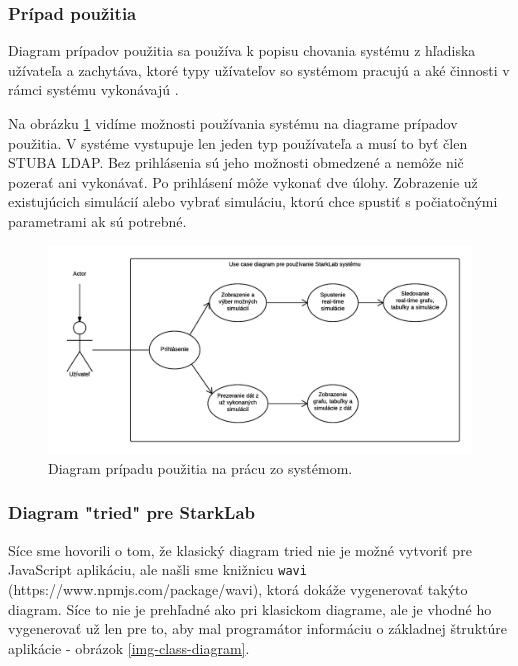 \subsubsection{Prípad použitia}
Diagram prípadov použitia sa používa k popisu chovania systému z hľadiska užívateľa a zachytáva, ktoré typy užívateľov so systémom pracujú a aké činnosti v rámci systému vykonávajú \cite{uml-usecase}.

Na obrázku \ref{img-use-case} vidíme možnosti používania systému na diagrame prípadov použitia. V systéme vystupuje len jeden typ používateľa a musí to byť člen STUBA LDAP. Bez prihlásenia sú jeho možnosti obmedzené a nemôže nič pozerať ani vykonávať. Po prihlásení môže vykonať dve úlohy. Zobrazenie už existujúcich simulácií alebo vybrať simuláciu, ktorú chce spustiť s počiatočnými parametrami ak sú potrebné.

\begin{figure}[H]
  \centering
  \includegraphics[scale=0.7]{img/diagrams/use-case.png}
  \caption{Diagram prípadu použitia na prácu zo systémom.}
  \label{img-use-case}
\end{figure}

\subsubsection{Diagram "tried" pre StarkLab}
Síce sme hovorili o tom, že klasický diagram tried nie je možné vytvoriť pre JavaScript aplikáciu, ale našli sme knižnicu \verb|wavi| (https://www.npmjs.com/package/wavi), ktorá dokáže vygenerovať takýto diagram. Síce to nie je prehľadné ako pri klasickom diagrame, ale je vhodné ho vygenerovať už len pre to, aby mal programátor informáciu o základnej štruktúre aplikácie - obrázok \ref{img-class-diagram}.

